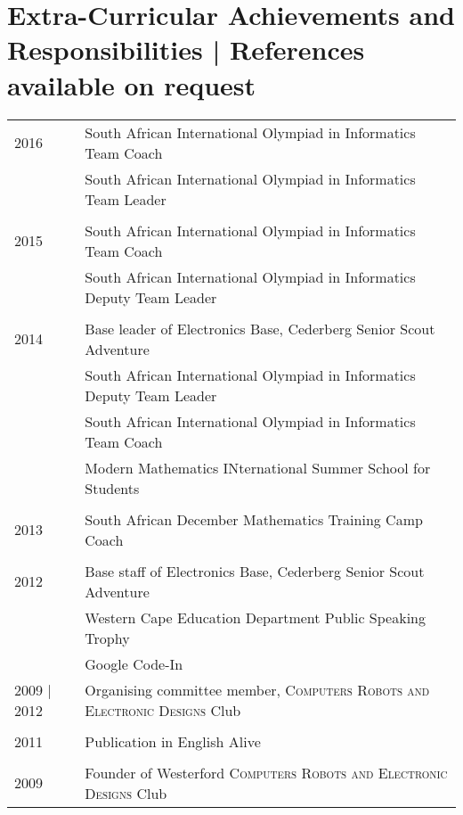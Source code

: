 \section{Extra-Curricular Achievements and Responsibilities \footnotesize | References available on request}

\begin{tabular}{R{3cm}|l}
2016 & South African International Olympiad in Informatics Team Coach\\
& South African International Olympiad in Informatics Team Leader\\
&\\
2015 & South African International Olympiad in Informatics Team Coach\\
& South African International Olympiad in Informatics Deputy Team Leader\\
&\\
2014 & Base leader of Electronics Base, Cederberg Senior Scout Adventure\\
& South African International Olympiad in Informatics Deputy Team Leader\\
& South African International Olympiad in Informatics Team Coach\\
& Modern Mathematics INternational Summer School for Students\\
&\\
2013 & South African December Mathematics Training Camp Coach\\
&\\
2012 & Base staff of Electronics Base, Cederberg Senior Scout Adventure\\
& Western Cape Education Department Public Speaking Trophy\\
&Google Code-In\\
2009 | 2012 & Organising committee member, \textsc{Computers Robots and Electronic Designs} Club\\
&\\
2011 & Publication in English Alive\\
&\\
2009 & Founder of Westerford \textsc{Computers Robots and Electronic Designs} Club\\
\end{tabular}

